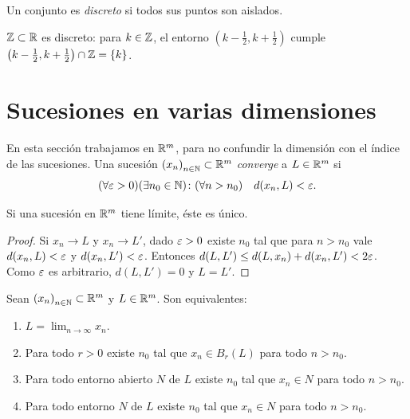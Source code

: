 \begin{definition}
  Un conjunto es \emph{discreto} si todos sus puntos son aislados.
\end{definition}

\begin{eg}
  \(\mathbb{Z} \subset \mathbb{R}\) es discreto: para \(k \in \mathbb{Z}\), el entorno \(\left( k - \frac{1}{2}, k + \frac{1}{2} \right)\) cumple \(\left( k - \frac{1}{2}, k + \frac{1}{2} \right) \cap \mathbb{Z} = \{k\}\).
\end{eg}

\section{Sucesiones en varias dimensiones}

En esta sección trabajamos en \(\mathbb{R}^m\), para no confundir la dimensión con el índice de las sucesiones. Una sucesión \({(x_n)}_{n \in \mathbb{N}} \subset \mathbb{R}^m\) \emph{converge} a \(L \in \mathbb{R}^m\) si
\[
  (\forall \varepsilon > 0)(\exists n_0 \in \mathbb{N}) \colon (\forall n > n_0) \quad d(x_n, L) < \varepsilon.
\]

\begin{lemma}
  Si una sucesión en \(\mathbb{R}^m\) tiene límite, éste es único.
\end{lemma}

\begin{proof}
  Si \(x_n \to L\) y \(x_n \to L'\), dado \(\varepsilon > 0\) existe \(n_0\) tal que para \(n > n_0\) vale \(d(x_n, L) < \varepsilon\) y \(d(x_n, L') < \varepsilon\). Entonces \(d(L, L') \leq d(L, x_n) + d(x_n, L') < 2\varepsilon\). Como \(\varepsilon\) es arbitrario, \(d(L, L') = 0\) y \(L = L'\).
\end{proof}

\begin{prop}
  Sean \({(x_n)}_{n \in \mathbb{N}} \subset \mathbb{R}^m\) y \(L \in \mathbb{R}^m\). Son equivalentes:
  \begin{enumerate}[label=(\arabic*)]
    \item \(L = \lim_{n \to \infty} x_n\).
    \item Para todo \(r > 0\) existe \(n_0\) tal que \(x_n \in B_r(L)\) para todo \(n > n_0\).
    \item Para todo entorno abierto \(N\) de \(L\) existe \(n_0\) tal que \(x_n \in N\) para todo \(n > n_0\).
    \item Para todo entorno \(N\) de \(L\) existe \(n_0\) tal que \(x_n \in N\) para todo \(n > n_0\).
  \end{enumerate}
\end{prop}

